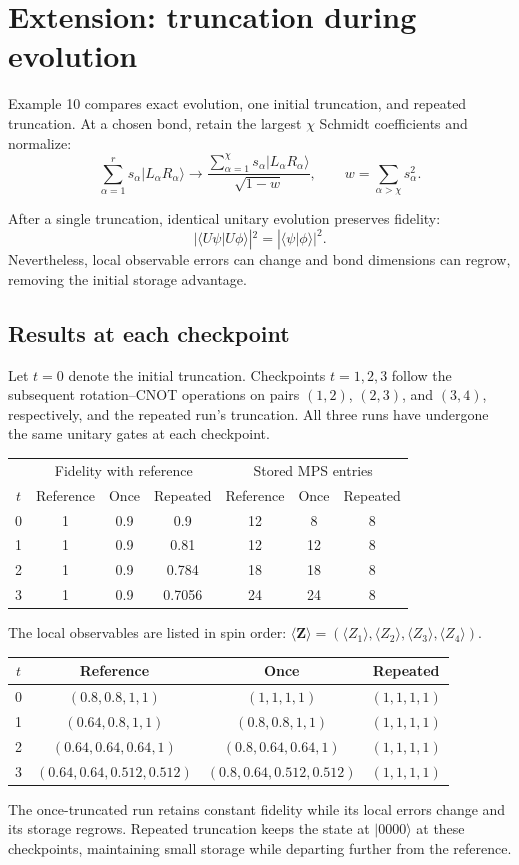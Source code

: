 \documentclass[11pt]{article}
\newcommand{\ket}[1]{\lvert #1\rangle}
\begin{document}
\section*{Extension: truncation during evolution}

Example 10 compares exact evolution, one initial truncation,
and repeated truncation. At a chosen bond, retain the largest
$\chi$ Schmidt coefficients and normalize:
\[
\sum_{\alpha=1}^{r}s_\alpha\ket{L_\alpha R_\alpha}
\longrightarrow
\frac{\sum_{\alpha=1}^{\chi}s_\alpha\ket{L_\alpha R_\alpha}}
{\sqrt{1-w}},
\qquad
w=\sum_{\alpha>\chi}s_\alpha^2.
\]

After a single truncation, identical unitary evolution preserves
fidelity:
\[
|\langle U\psi|U\phi\rangle|^2
=|\langle\psi|\phi\rangle|^2.
\]
Nevertheless, local observable errors can change and bond
dimensions can regrow, removing the initial storage advantage.

\subsection*{Results at each checkpoint}

Let $t=0$ denote the initial truncation. Checkpoints $t=1,2,3$
follow the subsequent rotation--CNOT operations on pairs
$(1,2)$, $(2,3)$, and $(3,4)$, respectively, and the repeated
run's truncation. All three runs have undergone the same
unitary gates at each checkpoint.

\begin{center}
\begin{tabular}{c|ccc|ccc}
\hline
& \multicolumn{3}{c|}{Fidelity with reference}
& \multicolumn{3}{c}{Stored MPS entries}\\
$t$ & Reference & Once & Repeated
    & Reference & Once & Repeated\\
\hline
0 & 1 & 0.9 & 0.9    & 12 &  8 & 8\\
1 & 1 & 0.9 & 0.81   & 12 & 12 & 8\\
2 & 1 & 0.9 & 0.784  & 18 & 18 & 8\\
3 & 1 & 0.9 & 0.7056 & 24 & 24 & 8\\
\hline
\end{tabular}
\end{center}

The local observables are listed in spin order:
$\langle\mathbf Z\rangle
=(\langle Z_1\rangle,\langle Z_2\rangle,
  \langle Z_3\rangle,\langle Z_4\rangle)$.

\begin{center}
\begin{tabular}{c|ccc}
\hline
$t$ & Reference & Once & Repeated\\
\hline
0 & $(0.8,0.8,1,1)$
  & $(1,1,1,1)$
  & $(1,1,1,1)$\\
1 & $(0.64,0.8,1,1)$
  & $(0.8,0.8,1,1)$
  & $(1,1,1,1)$\\
2 & $(0.64,0.64,0.64,1)$
  & $(0.8,0.64,0.64,1)$
  & $(1,1,1,1)$\\
3 & $(0.64,0.64,0.512,0.512)$
  & $(0.8,0.64,0.512,0.512)$
  & $(1,1,1,1)$\\
\hline
\end{tabular}
\end{center}

The once-truncated run retains constant fidelity while its
local errors change and its storage regrows. Repeated
truncation keeps the state at $\ket{0000}$ at these checkpoints,
maintaining small storage while departing further from the
reference.
\end{document}
